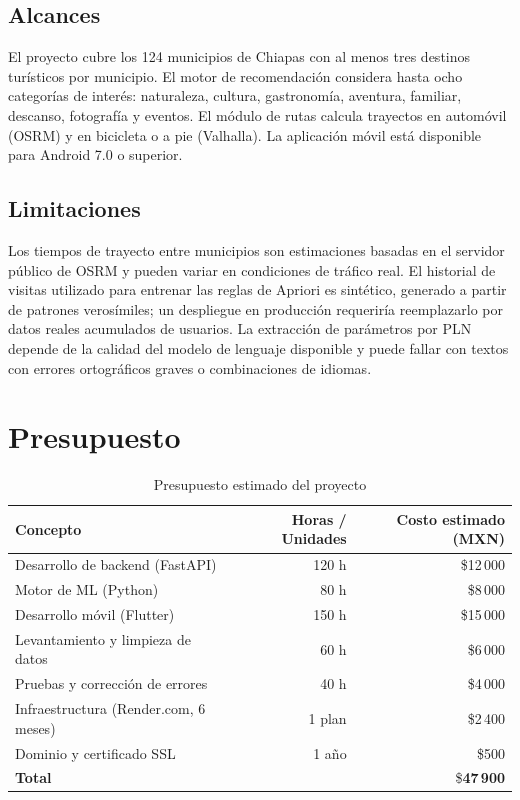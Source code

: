 \documentclass[12pt,letterpaper]{report}
\begin{document}
\subsection{Alcances}

El proyecto cubre los 124 municipios de Chiapas con al menos tres destinos turísticos por
municipio. El motor de recomendación considera hasta ocho categorías de interés: naturaleza,
cultura, gastronomía, aventura, familiar, descanso, fotografía y eventos. El módulo de rutas
calcula trayectos en automóvil (OSRM) y en bicicleta o a pie (Valhalla). La aplicación móvil
está disponible para Android 7.0 o superior.

\subsection{Limitaciones}

Los tiempos de trayecto entre municipios son estimaciones basadas en el servidor público de
OSRM y pueden variar en condiciones de tráfico real. El historial de visitas utilizado para
entrenar las reglas de Apriori es sintético, generado a partir de patrones verosímiles; un
despliegue en producción requeriría reemplazarlo por datos reales acumulados de usuarios.
La extracción de parámetros por PLN depende de la calidad del modelo de lenguaje disponible
y puede fallar con textos con errores ortográficos graves o combinaciones de idiomas.

\section{Presupuesto}

\begin{table}[H]
\centering
\caption{Presupuesto estimado del proyecto}
\label{tab:presupuesto}
\begin{tabular}{lrr}
\toprule
\textbf{Concepto} & \textbf{Horas / Unidades} & \textbf{Costo estimado (MXN)} \\
\midrule
Desarrollo de backend (FastAPI)      & 120 h & \$12\,000 \\
Motor de ML (Python)                 & 80 h  & \$8\,000 \\
Desarrollo móvil (Flutter)           & 150 h & \$15\,000 \\
Levantamiento y limpieza de datos    & 60 h  & \$6\,000 \\
Pruebas y corrección de errores      & 40 h  & \$4\,000 \\
Infraestructura (Render.com, 6 meses) & 1 plan & \$2\,400 \\
Dominio y certificado SSL            & 1 año & \$500 \\
\midrule
\textbf{Total}                       &       & \$\textbf{47\,900} \\
\bottomrule
\end{tabular}
\end{table}
\end{document}
